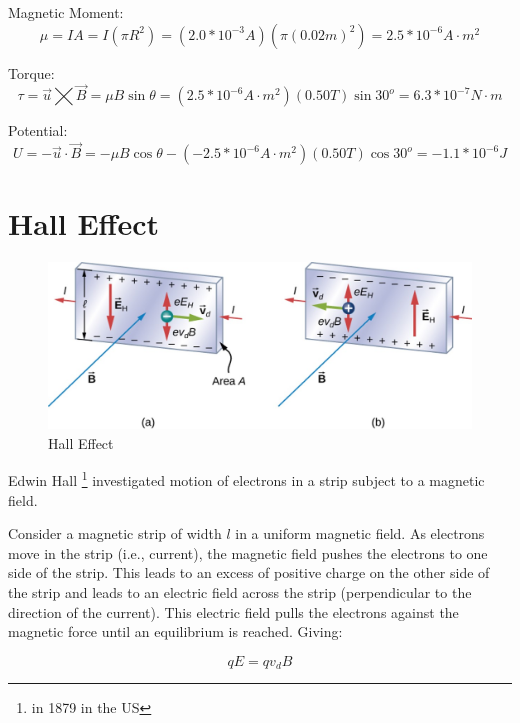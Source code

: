 \documentclass[14pt]{memoir}
\begin{document}
Magnetic Moment:
\begin{equation}
\mu = IA = I(\pi R^2) = (2.0*10^{-3}A)(\pi (0.02m)^2) = 2.5 * 10^{-6} A \cdot m^2
\end{equation}

Torque:
\begin{equation}
\tau = \vec{u} \bigtimes \vec{B} = \mu B \sin{\theta} = (2.5 * 10^{-6} A \cdot m^2) (0.50T)\sin{30^o} = 6.3 * 10^{-7} N\cdot m
\end{equation}

Potential: 
\begin{equation}
U = -\vec{u} \cdot \vec{B} = -\mu B \cos{\theta} - (-2.5 * 10^{-6} A \cdot m^2)(0.50T)\cos{30^o} = -1.1 * 10^{-6} J 
\end{equation}


\section{Hall Effect}

\begin{figure}[H]
\begin{center}
\includegraphics[scale=0.50]{fig/fig_11_17.jpg}
\caption{Hall Effect}
\label{fig:11_17}
\end{center}
\end{figure}

Edwin Hall \footnote{in 1879 in the US} investigated motion of electrons in a strip subject to a magnetic field.

Consider a magnetic strip of width $l$ in a uniform magnetic field. As electrons move in the strip (i.e., current), the magnetic field pushes the electrons to one side of the strip. This leads to an excess of positive charge on the other side of the strip and leads to an electric field across the strip (perpendicular to the direction of the current). This electric field pulls the electrons against the magnetic force until an equilibrium is reached. Giving:

\begin{equation}
qE = q v_d B
\end{equation}
\end{document}
